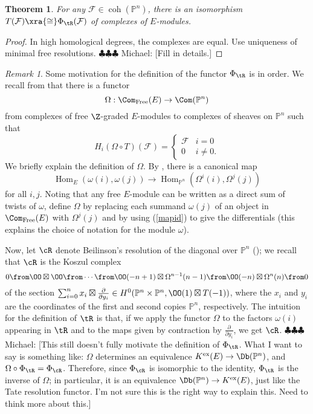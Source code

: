 \documentclass[12pt]{amsart}
\newtheorem{thm}[lemma]{Theorem}
\theoremstyle{definition}
\theoremstyle{remark}
\newtheorem{rem}[lemma]{Remark}
\newcommand{\PP}{\mathbb P}
\newcommand{\Hom}{\operatorname{Hom}} %
\newcommand{\F}{\FF}
\newcommand{\michael}[1]{{\color{red} \sf $\clubsuit\clubsuit\clubsuit$ Michael: [#1]}}
\def\on{\operatorname}
\def\om{\omega}
\def\F{\mathcal{F}}
\def\om{\omega}
\begin{document}
\begin{thm}
For any $\F \in \on{coh}(\PP^n)$, there is an isomorphism $T(\F) \xra{\cong} \Phi_{\tR}(\F)$ of complexes of $E$-modules.
\end{thm}

\begin{proof}
In high homological degrees, the complexes are equal. Use uniqueness of minimal free resolutions. \michael{Fill in details.}
\end{proof}

\begin{rem}
Some motivation for the definition of the functor $\Phi_{\tR}$ is in order. We recall from \cite[Section 6]{EFS} that there is a functor
\begin{equation}
\label{geobgg}
\Omega: \Com_{\on{Free}}(E) \to \Com(\PP^n)
\end{equation}
from complexes of free $\Z$-graded $E$-modules to complexes of sheaves on $\PP^n$ such that
$$
H_i(\Omega \circ T)(\F) = \begin{cases} \F & i = 0 \\ 0 & i \ne 0. \end{cases}
$$
We briefly explain the definition of $\Omega$. By \cite[Proposition 5.6]{EFS}, there is a canonical map
\begin{equation}
\label{mapid}
\Hom_E(\om(i), \om(j)) \to \Hom_{\PP^n}(\Omega^i(i), \Omega^j(j))
\end{equation}
for all $i, j$. Noting that any free $E$-module can be written as a direct sum of twists of $\om$, define $\Omega$ by 
replacing each summand $\om(j)$ of an object in $\Com_{\on{Free}}(E)$ with $\Omega^j(j)$ and by using (\ref{mapid}) to give the differentials (this explains the choice of notation for the module $\om$). 

Now, let $\cR$ denote Beilinson's resolution of the diagonal over $\PP^n$ (\cite{beilinson}); we recall that $\cR$ is the Koszul complex
$$
0 \from \OO \boxtimes \OO \from \cdots \from \OO(-n + 1) \boxtimes \Omega^{n-1}(n-1) \from \OO(-n) \boxtimes \Omega^n(n) \from 0
$$
of the section $\sum_{i = 0}^n x_i \boxtimes \frac{\partial}{\partial y_i} \in H^0(\PP^n \times \PP^n, \OO(1) \boxtimes T(-1))$, where the $x_i$ and $y_i$ are the coordinates of the first and second copies $\PP^n$, respectively. The intuition for the definition of $\tR$ is that, if we apply the functor $\Omega$ to the factors $\om(i)$ appearing in $\tR$ and to the maps given by contraction by $\frac{\partial}{\partial y_i}$, we get $\cR$. \michael{This still doesn't fully motivate the definition of $\Phi_{\tR}$. What I want to say is something like: $\Omega$ determines an equivalence $K^{\on{ex}}(E) \to \Db(\PP^n)$, and $\Omega \circ \Phi_{\tR} = \Phi_{\cR}$. Therefore, since $\Phi_{\cR}$ is isomorphic to the identity, $\Phi_{\tR}$ is the inverse of $\Omega$; in particular, it is an equivalence $\Db(\PP^n) \to K^{\on{ex}}(E)$, just like the Tate resolution functor. I'm not sure this is the right way to explain this. Need to think more about this.}
\end{rem}
\end{document}
